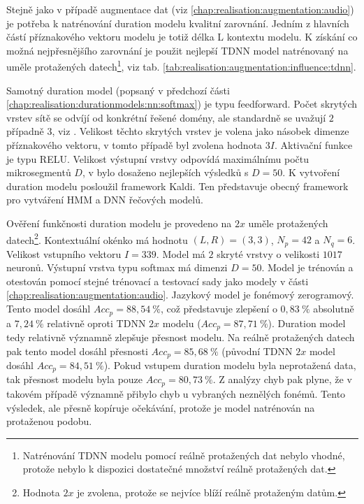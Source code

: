 Stejně jako v případě augmentace dat (viz \ref{chap:realisation:augmentation:audio}) je potřeba k natrénování duration modelu kvalitní zarovnání. Jedním z hlavních částí příznakového vektoru modelu je totiž délka L kontextu modelu. K získání co možná nejpřesnějšího zarovnání je použit nejlepší TDNN model natrénovaný na uměle protažených datech\footnote{Natrénování TDNN modelu pomocí reálně protažených dat nebylo vhodné, protože nebylo k dispozici dostatečné množství reálně protažených dat.}, viz tab. \ref{tab:realisation:augmentation:influence:tdnn}.

Samotný duration model (popsaný v předchozí části \ref{chap:realisation:durationmodels:nn:softmax}) je typu feedforward.  Počet skrytých vrstev sítě se odvíjí od konkrétní řešené domény, ale standardně se uvažují $2$ případně $3$, viz \cite{Hadian2017}. Velikost těchto skrytých vrstev je volena jako násobek dimenze příznakového vektoru, v tomto případě byl zvolena hodnota $3I$. Aktivační funkce je typu RELU. Velikost výstupní vrstvy odpovídá maximálnímu počtu mikrosegmentů $D$, v \cite{Hadian2017} bylo dosaženo nejlepších výsledků s $D=50$. K vytvoření duration modelu posloužil framework Kaldi. Ten představuje obecný framework pro vytváření HMM a DNN řečových modelů.

Ověření funkčnosti duration modelu je provedeno na $2x$ uměle protažených datech\footnote{Hodnota $2x$ je zvolena, protože se nejvíce blíží reálně protaženým datům.}. Kontextuální okénko má hodnotu $\left(L, R\right) = \left(3, 3\right)$, $N_{p} = 42$ a $N_{q} = 6$. Velikost vstupního vektoru $I = 339$. Model má $2$ skryté vrstvy o velikosti $1017$ neuronů. Výstupní vrstva typu softmax má dimenzi $D=50$. Model je trénován a otestován pomocí stejné trénovací a testovací sady jako modely v části \ref{chap:realisation:augmentation:audio}. Jazykový model je fonémový zerogramový. Tento model dosáhl $Acc_{p} = 88,54\ \%$, což představuje zlepšení o $0,83\ \%$ absolutně a $7,24\ \%$ relativně oproti TDNN $2x$ modelu ($Acc_{p} = 87,71\ \%$). Duration model tedy relativně významně zlepšuje přesnost modelu. Na reálně protažených datech pak tento model dosáhl přesnosti $Acc_{p} = 85,68\ \%$ (původní TDNN $2x$ model dosáhl $Acc_{p} = 84,51\ \%$). Pokud vstupem duration modelu byla neprotažená data, tak přesnost modelu byla pouze $Acc_{p} = 80,73\ \%$. Z analýzy chyb pak plyne, že v takovém případě významně přibylo chyb u vybraných neznělých fonémů. Tento výsledek, ale přesně kopíruje očekávání, protože je model natrénován na protaženou podobu.

